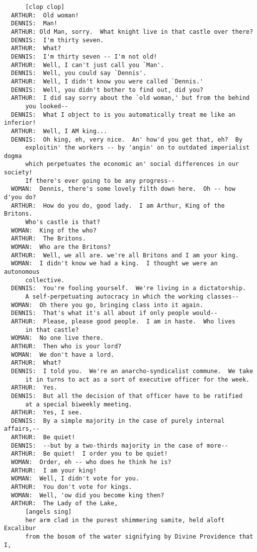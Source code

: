 \documentclass{article}
\begin{document}
\begin{verbatim}
      [clop clop]
  ARTHUR:  Old woman!
  DENNIS:  Man!
  ARTHUR: Old Man, sorry.  What knight live in that castle over there?
  DENNIS:  I'm thirty seven.
  ARTHUR:  What?
  DENNIS:  I'm thirty seven -- I'm not old!
  ARTHUR:  Well, I can't just call you `Man'.
  DENNIS:  Well, you could say `Dennis'.
  ARTHUR:  Well, I didn't know you were called `Dennis.'
  DENNIS:  Well, you didn't bother to find out, did you?
  ARTHUR:  I did say sorry about the `old woman,' but from the behind
      you looked--
  DENNIS:  What I object to is you automatically treat me like an inferior!
  ARTHUR:  Well, I AM king...
  DENNIS:  Oh king, eh, very nice.  An' how'd you get that, eh?  By
      exploitin' the workers -- by 'angin' on to outdated imperialist dogma
      which perpetuates the economic an' social differences in our society!
      If there's ever going to be any progress--
  WOMAN:  Dennis, there's some lovely filth down here.  Oh -- how d'you do?
  ARTHUR:  How do you do, good lady.  I am Arthur, King of the Britons.
      Who's castle is that?
  WOMAN:  King of the who?
  ARTHUR:  The Britons.
  WOMAN:  Who are the Britons?
  ARTHUR:  Well, we all are. we're all Britons and I am your king.
  WOMAN:  I didn't know we had a king.  I thought we were an autonomous
      collective.
  DENNIS:  You're fooling yourself.  We're living in a dictatorship.
      A self-perpetuating autocracy in which the working classes--
  WOMAN:  Oh there you go, bringing class into it again.
  DENNIS:  That's what it's all about if only people would--
  ARTHUR:  Please, please good people.  I am in haste.  Who lives
      in that castle?
  WOMAN:  No one live there.
  ARTHUR:  Then who is your lord?
  WOMAN:  We don't have a lord.
  ARTHUR:  What?
  DENNIS:  I told you.  We're an anarcho-syndicalist commune.  We take
      it in turns to act as a sort of executive officer for the week.
  ARTHUR:  Yes.
  DENNIS:  But all the decision of that officer have to be ratified
      at a special biweekly meeting.
  ARTHUR:  Yes, I see.
  DENNIS:  By a simple majority in the case of purely internal affairs,--
  ARTHUR:  Be quiet!
  DENNIS:  --but by a two-thirds majority in the case of more--
  ARTHUR:  Be quiet!  I order you to be quiet!
  WOMAN:  Order, eh -- who does he think he is?
  ARTHUR:  I am your king!
  WOMAN:  Well, I didn't vote for you.
  ARTHUR:  You don't vote for kings.
  WOMAN:  Well, 'ow did you become king then?
  ARTHUR:  The Lady of the Lake,
      [angels sing]
      her arm clad in the purest shimmering samite, held aloft Excalibur
      from the bosom of the water signifying by Divine Providence that I,

\end{verbatim}
\end{document}
